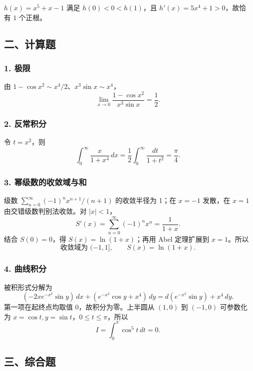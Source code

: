 \documentclass[11pt,fontset=fandol]{ctexart}
\begin{document}
\(h(x)=x^5+x-1\) 满足 \(h(0)<0<h(1)\)，且 \(h'(x)=5x^4+1>0\)，故恰有
\(\boxed{1}\) 个正根。

\subsection{二、计算题}\label{ux4e8cux8ba1ux7b97ux9898}

\subsubsection{1. 极限}\label{ux6781ux9650}

由 \(1-\cos x^2\sim x^4/2\)、\(x^3\sin x\sim x^4\)， \[
\boxed{\lim_{x\to0}\frac{1-\cos x^2}{x^3\sin x}=\frac12.}
\]

\subsubsection{2. 反常积分}\label{ux53cdux5e38ux79efux5206}

令 \(t=x^2\)，则 \[
\boxed{\int_0^{\infty}\frac{x}{1+x^4}\,dx
=\frac12\int_0^{\infty}\frac{dt}{1+t^2}=\frac\pi4.}
\]

\subsubsection{3.
幂级数的收敛域与和}\label{ux5e42ux7ea7ux6570ux7684ux6536ux655bux57dfux4e0eux548c}

级数 \(\sum_{n=0}^{\infty}(-1)^nx^{n+1}/(n+1)\) 的收敛半径为 1；在
\(x=-1\) 发散，在 \(x=1\) 由交错级数判别法收敛。对 \(|x|<1\)， \[
S'(x)=\sum_{n=0}^{\infty}(-1)^nx^n=\frac1{1+x}.
\] 结合 \(S(0)=0\)，得 \(S(x)=\ln(1+x)\)；再用 Abel 定理扩展到
\(x=1\)。所以 \[
\boxed{\text{收敛域为 }(-1,1],\qquad S(x)=\ln(1+x).}
\]

\subsubsection{4. 曲线积分}\label{ux66f2ux7ebfux79efux5206}

被积形式分解为 \[
(-2xe^{-x^2}\sin y)\,dx+(e^{-x^2}\cos y+x^4)\,dy
=d(e^{-x^2}\sin y)+x^4\,dy.
\] 第一项在起终点均取值 0，故积分为零。上半圆从 \((1,0)\) 到 \((-1,0)\)
可参数化为 \(x=\cos t,y=\sin t\)，\(0\leq t\leq\pi\)，所以 \[
I=\int_0^\pi\cos^5t\,dt=\boxed0.
\]

\subsection{三、综合题}\label{ux4e09ux7efcux5408ux9898}
\end{document}
